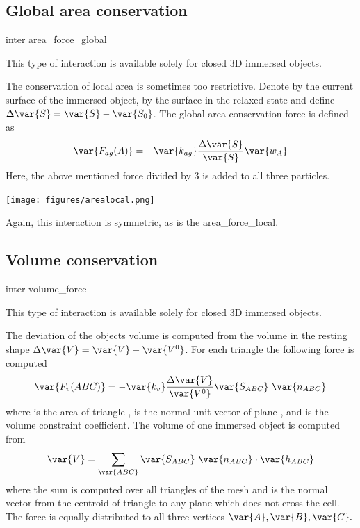 \subsection{Global area conservation}

\begin{essyntax}
  inter 
  area_force_global
   
\end{essyntax}
This type of interaction is available solely for closed 3D immersed objects.

The conservation of local area is sometimes too restrictive. Denote by  the 
current surface of the immersed object, by  the surface in the relaxed 
state and define $\Delta \var{S} = \var{S} - \var{S_0}$. The global area conservation 
force is defined as
\begin{equation}
\var{F_{ag}(A)} = - \var{k_{ag}}\frac{\Delta \var{S}}{\var{S}}\var{w_{A}}
\end{equation}
Here, the above mentioned force divided by 3 is added to all three particles.
\begin{center}
  \texttt{[image: figures/arealocal.png]}
\end{center}
Again, this interaction is symmetric, as is the area\_{}force\_{}local.

\subsection{Volume conservation}

\begin{essyntax}
  inter 
  volume_force
   
\end{essyntax}
This type of interaction is available solely for closed 3D immersed objects.

The deviation of the objects volume  is computed from the volume in 
the resting shape $\Delta \var{V} = \var{V} - \var{V^0}$. For each triangle the following 
force is computed
\begin{equation}
\var{F_v(ABC)} = -\var{k_v}\frac{\Delta \var{V}}{\var{V^0}} \var{S_{ABC}}\ \var{n_{ABC}}
\end{equation}
where  is the area of triangle ,  is the normal unit 
vector of plane , and  is the volume constraint coefficient. The volume 
of one immersed object is computed from
\begin{equation}
\var{V} = \sum_{\var{ABC}}\var{S_{ABC}}\ \var{n_{ABC}}\cdot \var{h_{ABC}}
\end{equation}
where the sum is computed over all triangles of the mesh and  is the normal 
vector from the centroid of triangle  to any plane which does not cross the cell. 
The force  is equally distributed to all three vertices $\var{A},\var{B},
\var{C}.$


